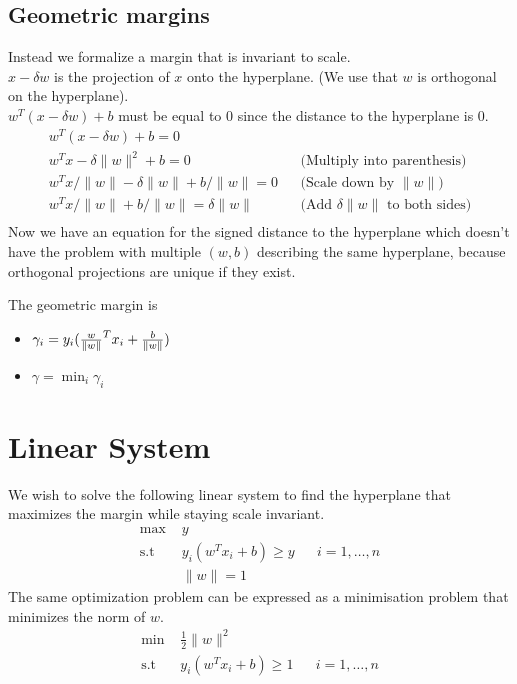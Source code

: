 \documentclass{article}
\begin{document}
  \subsection{Geometric margins}
    Instead we formalize a margin that is invariant to scale.\\
    $x-\delta w$ is the projection of $x$ onto the hyperplane. (We use that $w$ is orthogonal on the hyperplane).\\
    $w^T(x-\delta w)+b$ must be equal to $0$ since the distance to the hyperplane is $0$.\\
    \begin{align}
      w^T(x-\delta w)+b = 0\\
      w^Tx-\delta \lVert w \rVert^2 +b = 0 && \text{(Multiply into parenthesis)}\\
      w^Tx/\lVert w \rVert - \delta \lVert w \rVert+b/\lVert w \rVert = 0 && \text{(Scale down by $\lVert w \rVert$)}\\
      w^Tx/\lVert w \rVert +b/\lVert w \rVert = \delta \lVert w \rVert && \text{(Add $\delta \lVert w \rVert$ to both sides)}\\
    \end{align}
    Now we have an equation for the signed distance to the hyperplane which doesn't have the problem with multiple $(w, b)$ describing the same hyperplane, because orthogonal projections are unique if they exist.
    
    The geometric margin is
    \begin{itemize}
        \item $\gamma_i = y_i(
        \frac{w}{\lVert w \rVert}^T x_i + \frac{b}{\lVert w \rVert})$
        \item $\gamma = \min_{i} \gamma_i$
    \end{itemize}

\section{Linear System}
  We wish to solve the following linear system to find the hyperplane that maximizes the margin while staying scale invariant.
  \begin{align}
    \text{max } & y \\ 
    \text{s.t } & y_i(w^Tx_i+b)\geq y &&  i=1,\dots,n\\
         & \lVert w \rVert = 1
  \end{align}
  The same optimization problem can be expressed as a minimisation problem that minimizes the norm of $w$.
  \begin{align}
    \text{min } & \frac{1}{2}\lVert w \rVert^2 \\ 
    \text{s.t } & y_i(w^Tx_i+b)\geq 1 &&  i=1,\dots,n
  \end{align}
\end{document}
